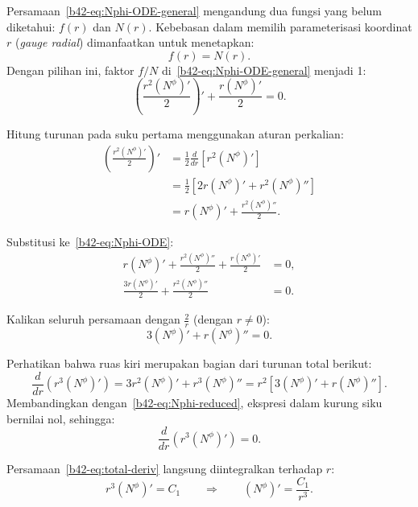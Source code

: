 Persamaan~\eqref{b42-eq:Nphi-ODE-general} mengandung dua fungsi yang belum diketahui: $f(r)$ dan $N(r)$. Kebebasan dalam memilih parameterisasi koordinat $r$ (\emph{gauge radial}) dimanfaatkan untuk menetapkan:
\begin{equation}
    f(r) = N(r). \label{b42-eq:gauge}
\end{equation}
Dengan pilihan ini, faktor $f/N$ di~\eqref{b42-eq:Nphi-ODE-general} menjadi 1:
\begin{equation}
    \left(\frac{r^2(N^\phi)'}{2}\right)' + \frac{r(N^\phi)'}{2} = 0. \label{b42-eq:Nphi-ODE}
\end{equation}

Hitung turunan pada suku pertama menggunakan aturan perkalian:
\begin{align}
    \left(\frac{r^2(N^\phi)'}{2}\right)' &= \frac{1}{2}\frac{d}{dr}\!\left[r^2(N^\phi)'\right] \nonumber\\[4pt]
    &= \frac{1}{2}\!\left[2r(N^\phi)' + r^2(N^\phi)''\right] \nonumber\\[4pt]
    &= r(N^\phi)' + \frac{r^2(N^\phi)''}{2}. \label{b42-eq:deriv-expand}
\end{align}

Substitusi ke~\eqref{b42-eq:Nphi-ODE}:
\begin{align}
    r(N^\phi)' + \frac{r^2(N^\phi)''}{2} + \frac{r(N^\phi)'}{2} &= 0, \nonumber\\[4pt]
    \frac{3r(N^\phi)'}{2} + \frac{r^2(N^\phi)''}{2} &= 0.
\end{align}

Kalikan seluruh persamaan dengan $\frac{2}{r}$ (dengan $r \neq 0$):
\begin{equation}
    3(N^\phi)' + r(N^\phi)'' = 0. \label{b42-eq:Nphi-reduced}
\end{equation}

Perhatikan bahwa ruas kiri merupakan bagian dari turunan total berikut:
\begin{equation}
    \frac{d}{dr}\!\left(r^3(N^\phi)'\right) = 3r^2(N^\phi)' + r^3(N^\phi)'' = r^2\!\left[3(N^\phi)' + r(N^\phi)''\right].
\end{equation}
Membandingkan dengan~\eqref{b42-eq:Nphi-reduced}, ekspresi dalam kurung siku bernilai nol, sehingga:
\begin{equation}
    \frac{d}{dr}\!\left(r^3(N^\phi)'\right) = 0. \label{b42-eq:total-deriv}
\end{equation}

Persamaan~\eqref{b42-eq:total-deriv} langsung diintegralkan terhadap $r$:
\begin{equation}
    r^3(N^\phi)' = C_1 \qquad \Longrightarrow \qquad (N^\phi)' = \frac{C_1}{r^3}. \label{b42-eq:Nphi-prime-gen}
\end{equation}

